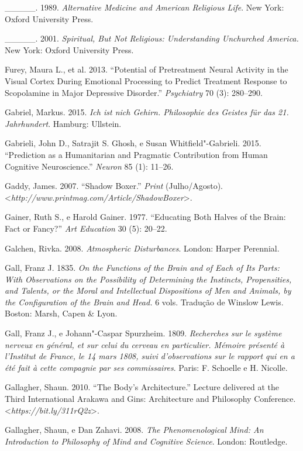 {\begin{Parskip}
\_\_\_\_\_. 1989. \emph{Alternative Medicine and American Religious
Life}. New York: Oxford University Press.

\_\_\_\_\_. 2001. \emph{Spiritual, But Not Religious: Understanding
Unchurched America.} New York: Oxford University Press.

Furey, Maura L., et al. 2013. ``Potential of Pretreatment Neural
Activity in the Visual Cortex During Emotional Processing to Predict
Treatment Response to Scopolamine in Major Depressive Disorder.''
\emph{ Psychiatry} 70 (3): 280--290.

Gabriel, Markus. 2015. \emph{Ich ist nich Gehirn. Philosophie des
Geistes für das 21. Jahrhundert}. Hamburg: Ullstein.

Gabrieli, John D., Satrajit S. Ghosh, e Susan Whitfield"-Gabrieli. 2015.
``Prediction as a Humanitarian and Pragmatic Contribution from Human
Cognitive Neuroscience.'' \emph{Neuron} 85 (1): 11--26.

Gaddy, James. 2007. ``Shadow Boxer.'' \emph{Print} (Julho/Agosto).
\textless{}\emph{http://www.printmag.com/Article/ShadowBoxer}\textgreater{}.

Gainer, Ruth S., e Harold Gainer. 1977. ``Educating Both Halves of the
Brain: Fact or Fancy?'' \emph{Art Education} 30 (5): 20--22.

Galchen, Rivka. 2008. \emph{Atmospheric Disturbances}. London: Harper
Perennial.

Gall, Franz J. 1835. \emph{On the Functions of the Brain and of Each of
Its Parts: With Observations on the Possibility of Determining the
Instincts, Propensities, and Talents, or the Moral and Intellectual
Dispositions of Men and Animals, by the Configuration of the Brain and
Head.} 6 vols. Tradução de Winslow Lewis. Boston: Marsh, Capen \& Lyon.

Gall, Franz J., e Johann"-Caspar Spurzheim. 1809. \emph{Recherches sur le
système nerveux en général, et sur celui du cerveau en particulier.
Mémoire présenté à l'Institut de France, le 14 mars 1808, suivi
d'observations sur le rapport qui en a été fait à cette compagnie par
ses commissaires}. Paris: F. Schoelle e H. Nicolle.

Gallagher, Shaun. 2010. ``The Body's Architecture.'' Lecture delivered
at the Third International Arakawa and Gins: Architecture and Philosophy
Conference.
\textless{}\emph{https://bit.ly/311rQ2z}\textgreater{}.

Gallagher, Shaun, e Dan Zahavi. 2008. \emph{The Phenomenological Mind:
An Introduction to Philosophy of Mind and Cognitive Science}. London:
Routledge.


\end{Parskip}}
